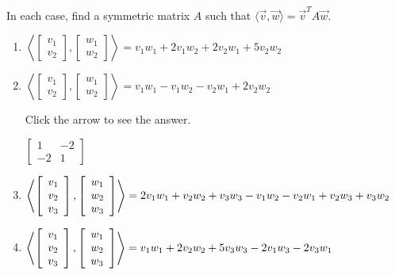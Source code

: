 \documentclass{ximera}
\begin{document}
\begin{problem}\label{prob:inner_prod_13}
In each case, find a symmetric matrix $A$ such that $\langle\vec{v}, \vec{w}\rangle = \vec{v}^{T}A\vec{w}$.


\begin{enumerate} 
\item
$  \left\langle
\left[ \begin{array}{r}
v_1 \\
v_2
\end{array} \right], \left[ \begin{array}{r}
w_1 \\
w_2
\end{array} \right]
\right\rangle
= v_1w_1 + 2v_1w_2 + 2v_2w_1 + 5v_2w_2$

\item
$\left\langle
\left[ \begin{array}{r}
v_1 \\
v_2
\end{array} \right], \left[ \begin{array}{r}
w_1 \\
w_2
\end{array} \right]
\right\rangle
= v_1w_1 - v_1w_2 - v_2w_1 + 2v_2w_2$

Click the arrow to see the answer.
\begin{expandable}
$\left[ \begin{array}{rr}
1 & -2 \\
-2 & 1
\end{array} \right]$
\end{expandable}

\item
$\left\langle
\left[ \begin{array}{r}
v_1 \\
v_2 \\
v_3
\end{array} \right], \left[ \begin{array}{r}
w_1 \\
w_2 \\
w_3
\end{array} \right]
\right\rangle
= 2v_1w_1 + v_2w_2 + v_3w_3 - v_1w_2 \\ -v_2w_1 + v_2w_3 + v_3w_2$

\item
$\left\langle
\left[ \begin{array}{r}
v_1 \\
v_2 \\
v_3
\end{array} \right], \left[ \begin{array}{r}
w_1 \\
w_2 \\
w_3
\end{array} \right]
\right\rangle
= v_1w_1 + 2v_2w_2 + 5v_3w_3 \\ - 2v_1w_3 - 2v_3w_1$


\end{enumerate}
\end{problem}
\end{document}
